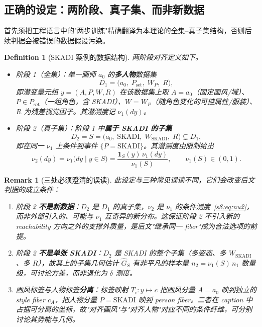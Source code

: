 \documentclass[11pt,a4paper]{article}
\newtheorem{definition}[theorem]{Definition}
\newtheorem{remark}[theorem]{Remark}
\begin{document}
\subsection{正确的设定：两阶段、真子集、而非新数据}\label{s8:setting}

首先须把工程语言中的"两步训练"精确翻译为本理论的全集--真子集结构，否则后续判据会被错误的数据假设污染。

\begin{definition}[SKADI 案例的数据结构]\label{s8:def-data}
两阶段对齐定义如下。
\begin{itemize}
\item \emph{阶段 1（全集）}：单一画师 $a_0$ 的\textbf{多人物}数据集
\[
D_1=\bigl(a_0,\;P_{\mathrm{set}},\;W_P,\;R\bigr),
\]
即潜变量元组 $y=(A,P,W,R)$ 在该数据集上取 $A=a_0$（固定画风/域）、$P\in P_{\mathrm{set}}$（一组角色，含 SKADI）、$W=W_P$（随角色变化的可控属性/服装）、$R$ 为残差视觉因子。其潜测度记 $\nu_1(dy)$。
\item \emph{阶段 2（真子集）}：阶段 1 中\textbf{属于 SKADI 的子集}
\[
D_2=S=\bigl(a_0,\;\mathrm{SKADI},\;W_{\mathrm{SKADI}},\;R\bigr)\subsetneq D_1,
\]
即在同一 $\nu_1$ 上条件到事件 $\{P=\mathrm{SKADI}\}$。其潜测度由限制给出
\begin{equation}\label{s8:eq:nu2}
\nu_2(dy)=\nu_1\!\bigl(dy\mid y\in S\bigr)=\frac{\mathbf{1}_S(y)\,\nu_1(dy)}{\nu_1(S)},\qquad \nu_1(S)\in(0,1).
\end{equation}
\end{itemize}
\end{definition}

\begin{remark}[三处必须澄清的误读]\label{s8:rem-misread}
此设定与三种常见误读不同，它们会改变后文判据的成立条件：
\begin{enumerate}[label=(\roman*),leftmargin=*]
\item 阶段 2 \textbf{不是新数据}：$D_2$ 是 $D_1$ 的真子集，$\nu_2$ 是 $\nu_1$ 的条件测度~\eqref{s8:eq:nu2}，而非外部引入的、可能与 $\nu_1$ 互奇异的新分布。这保证阶段 2 不引入新的 reachability 方向之外的支撑外质量，是后文"继承同一 fiber"成为合法选项的前提。
\item 阶段 2 \textbf{不是单张 SKADI}：$D_2$ 是 SKADI 的整个子集（多姿态、多 $W_{\mathrm{SKADI}}$、多 $R$），故其上的子集几何估计 $\widehat G_S$ 有非平凡的样本量 $n_2=\nu_1(S)\,n_1$ 数量级，可讨论方差，而非退化为 $\delta$ 测度。
\item 画风标签与人物标签\textbf{分离}：标签映射 $T_i:y\mapsto c$ 把画风分量 $A=a_0$ 映到独立的 style fiber $c_A$，把人物分量 $P=\mathrm{SKADI}$ 映到 person fiber。二者在 caption 中占据可分离的坐标，故"对齐画风"与"对齐人物"对应不同的条件纤维，可分别讨论其势能与几何。
\end{enumerate}
\end{remark}
\end{document}

